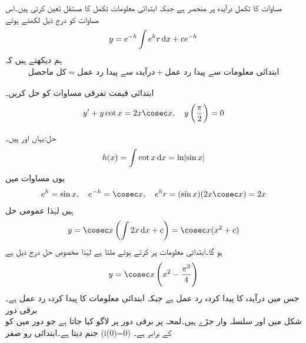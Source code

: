 مساوات  کا تکمل درآیدہ  پر منحصر ہے جبکہ ابتدائی معلومات تکمل کا مستقل  تعین کرتی ہیں۔اس مساوات کو درج ذیل لکھتے ہوئے 
\begin{align}\label{مساوات_سادہ_اول_متجانس_خطی_حل_ب}
y=e^{-h}\int e^h r \dif x+ce^{-h}
\end{align}
ہم دیکھتے ہیں کہ
\begin{align}
\text{کل ماحصل}=\text{درآیدہ سے پیدا رد عمل}+\text{ابتدائی معلومات سے پیدا رد عمل}
\end{align}


ابتدائی قیمت تفرقی مساوات کو حل کریں۔
\begin{align*}
y'+y\cot x=2x\cosec x,\quad y\left(\frac{\pi}{2}\right)=0
\end{align*}

حل:یہاں  اور  ہیں۔
\begin{align*}
h(x)=\int \cot x \dif x=\ln \abs{\sin x}
\end{align*}
یوں مساوات  میں
\begin{align*}
e^h=\sin x, \quad e^{-h}=\cosec x, \quad e^h r= (\sin x) (2x\cosec x)=2x
\end{align*}
ہیں لہٰذا عمومی حل
\begin{align*}
y=\cosec x \left(\int 2x\dif x +c\right)=\cosec x (x^2+c)
\end{align*}
ہو گا۔ابتدائی معلومات پر کرتے ہوئے   ملتا ہے لہٰذا مخصوص حل درج ذیل ہے
\begin{align*}
y=\cosec x \left(x^2-\frac{\pi^2}{4}\right)
\end{align*}
جس میں  درآیدہ کا پیدا کردہ رد عمل ہے جبکہ  ابتدائی معلومات کا پیدا کردہ رد عمل ہے۔
 \quad برقی دور\\
شکل  میں   اور   سلسلہ وار جڑے ہیں۔لمحہ  پر   برقی دور پر لاگو کیا جاتا ہے جو دور میں   کو جنم دیتا ہے۔ابتدائی رو صفر (i(0)=0) کے برابر ہے۔

